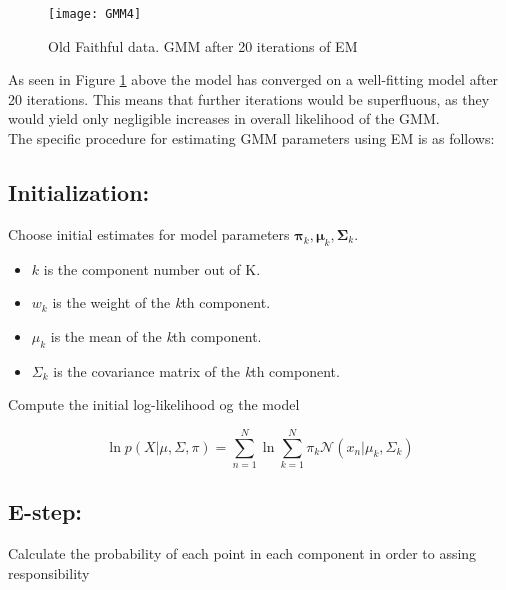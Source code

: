 \begin{figure}[H]
\centering
\texttt{[image: GMM4]}
\caption{Old Faithful data. GMM after 20 iterations of EM}
\label{fig:GMM4}
\end{figure}

As seen in Figure \ref{fig:GMM4} above the model has converged on a well-fitting model after 20 iterations.
This means that further iterations would be superfluous, as they would yield only negligible increases in overall likelihood of the GMM. \\

The specific procedure for estimating GMM parameters using EM is as follows: %

\subsection*{Initialization:}

Choose initial estimates for model parameters $ \mathbf{\pi}_{k}, \mathbf{\mu}_{k}, \mathbf{\Sigma}_{k} $.

\begin{itemize}

\item
$ k $ is the component number out of K.

\item
$ w_{k} $ is the weight of the \textit{k}th component.

\item
$ \mu_{k}$ is the mean of the \textit{k}th component.

\item
$ \Sigma_{k} $ is the covariance matrix of the \textit{k}th component.

\end{itemize}


Compute the initial log-likelihood og the model

\begin{equation} \label{eq:loglikeGMM}
\ln p\left(X | \mu, \Sigma, \pi\right) = 
\sum_{n=1}^{N} \ln \sum_{k=1}^{N} \pi_{k}\mathcal{N}(x_{n}|\mu_{k},\Sigma_{k})
\end{equation}

\subsection*{E-step:}
Calculate the probability of each point in each component in order to assing responsibility

